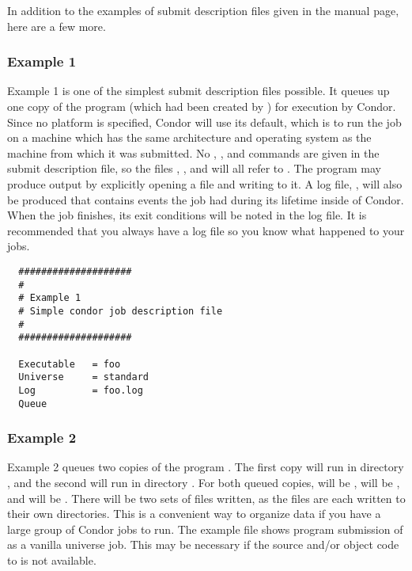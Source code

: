 In addition to the examples of submit description files given
in the 
 manual page, here are a few more.

\subsubsection{Example 1} 

Example 1 is one of the simplest submit description
files possible. It queues up one copy of the program 
(which had been created by )
for execution by Condor.
Since no platform is specified, Condor will use its default,
which is to run the job on a machine which has the
same architecture and operating system as the machine from which it was
submitted. 
No 
,
, and
commands are given in the submit
description file, so the
files , , and  will all refer to 
.
The program may produce output by explicitly opening a file and writing to
it.
A log file, , will also be produced that contains events
the job had during its lifetime inside of Condor.
When the job finishes, its exit conditions will be noted in the log file.
It is recommended that you always have a log file so you know what
happened to your jobs.
\begin{verbatim}
  ####################                                                    
  # 
  # Example 1                                                            
  # Simple condor job description file                                    
  #                                                                       
  ####################                                                    
                                                                          
  Executable   = foo                                                    
  Universe     = standard                                                    
  Log          = foo.log                                                    
  Queue    
\end{verbatim}

\subsubsection{Example 2}

Example 2 queues two copies of the program . The
first copy will run in directory , and the second will run in
directory . For both queued copies, 
 will be ,
 will be , and
 will be .
There will be two sets of files written,
as the files are each written to their own directories.
This is a convenient way to organize data if you
have a large group of Condor jobs to run. The example file 
shows program submission of
 as a vanilla universe job.
This may be necessary if the source
and/or object code to  is not available.

